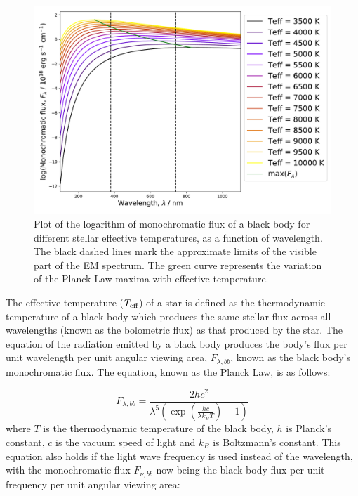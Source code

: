 \documentclass[12pt, a4paper]{report}
\begin{document}
\begin{figure}[h!]
\begin{center}
\includegraphics[width=1.0\textwidth]{blackbody_teff_logF_illustration.pdf}
\caption{Plot of the logarithm of monochromatic flux of a black body for different stellar effective temperatures, as a function of wavelength. The black dashed lines mark the approximate limits of the visible part of the EM spectrum. The green curve represents the variation of the Planck Law maxima with effective temperature.}
\label{planck_curve}
\end{center}
\end{figure}

The effective temperature ($T_{\textnormal{eff}}$) of a star is defined as the thermodynamic temperature of a black body which produces the same stellar flux across all wavelengths (known as the bolometric flux) as that produced by the star. The equation of the radiation emitted by a black body produces the body's flux per unit wavelength per unit angular viewing area, $F_{\lambda,bb}$, known as the black body's monochromatic flux. The equation, known as the Planck Law, is as follows:


\begin{equation}
F_{\lambda,bb} = \frac{2hc^{2}}{\lambda^{5}\left(\exp\left({\frac{hc}{\lambda k_{B}T}}\right) - 1\right)}
\label{planck_bb}
\end{equation}
where $T$ is the thermodynamic temperature of the black body, $h$ is Planck's constant, $c$ is the vacuum speed of light and $k_{B}$ is Boltzmann's constant. This equation also holds if the light wave frequency is used instead of the wavelength, with the monochromatic flux $F_{\nu,bb}$ now being the black body flux per unit frequency per unit angular viewing area:
\end{document}
